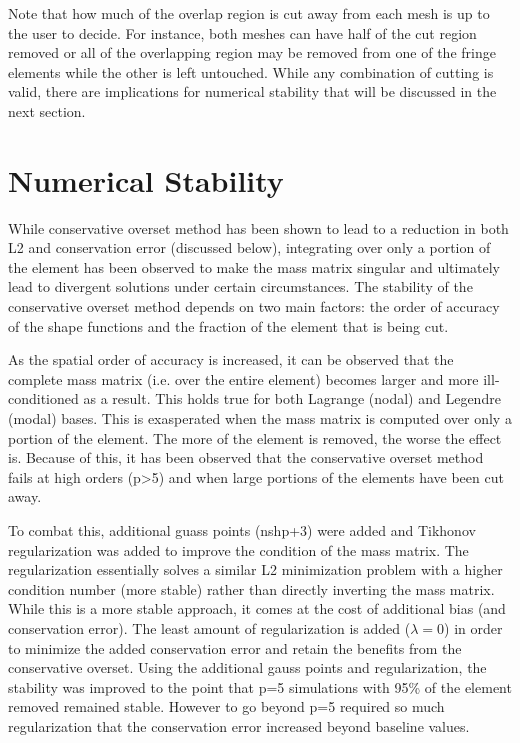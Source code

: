 \documentclass[11pt]{article}
\begin{document}
Note that how much of the overlap region is cut away from each mesh is up to the user to decide. 
For instance, both meshes can have half of the cut region removed or all of the overlapping
region may be removed from one of the fringe elements while the other 
is left untouched. While any combination of cutting is valid, 
there are implications for numerical stability that will be discussed in the next section. 

\section{Numerical Stability}

While conservative overset method has been shown to lead to a reduction in both L2 and
conservation error (discussed below), integrating over only a portion of the element has been 
observed to make the mass matrix singular and ultimately lead to divergent solutions
under certain circumstances. The stability of the conservative overset method depends on two main
factors: the order of accuracy of the shape functions and the fraction of the element that
is being cut. 

As the spatial order of accuracy is increased, it can be observed that the complete mass matrix
(i.e. over the entire element) becomes larger and more ill-conditioned as a result. This holds
true for both Lagrange (nodal) and Legendre (modal) bases. This is exasperated when 
the mass matrix is computed over only a portion of the element. The more of the element is removed,
the worse the effect is. Because of this, it has been observed that the conservative overset
method fails at high orders (p>5) and when large portions of the elements have been cut away.

To combat this, additional guass points (nshp+3) were added and Tikhonov regularization was added to 
improve the condition of the mass matrix. The regularization essentially solves a similar
L2 minimization problem with a higher condition number (more stable) rather than directly
inverting the mass matrix. While this is a more stable approach, it comes at the cost of additional
bias (and conservation error). The least amount of regularization is added ($\lambda = 0$) in order 
to minimize the added conservation error and retain the benefits from the conservative overset. 
Using the additional gauss points and regularization, the stability was improved to the point that
p=5 simulations with 95\% of the element removed remained stable. However to go beyond p=5 required
so much regularization that the conservation error increased beyond baseline values. 
\end{document}
